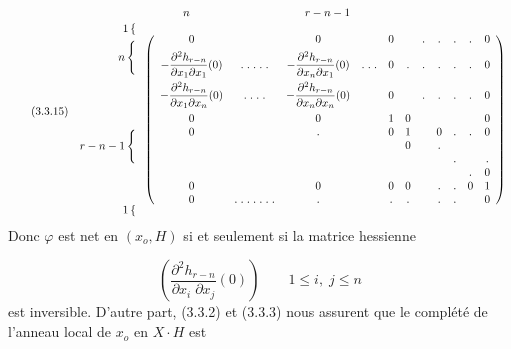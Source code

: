 \begin{equation}\tag{3.3.15}
 \begin{array}{r@{\;}l}
 & \hspace{1.2cm} n \hspace{3.6cm} r-n-1 \\[0.5ex]
\begin{array}{r}
1\,\{ \\[1ex]
n\,\Bigg\{\vphantom{\displaystyle\frac{\partial^2 h_{r-n}}{\partial x_1 \partial x_1}(0)} \\[1.5ex]
\vphantom{\displaystyle\frac{\partial^2 h_{r-n}}{\partial x_1 \partial x_n}(0)} \\[1.5ex]
\\
\\
r-n-1\,\Bigg\{ \\
\\
\\
\\
1\,\{
\end{array}
&
\left(
\begin{array}{ccccccccccc}
0 & & 0 & & 0 & & . & . & . & . & 0 \\[1ex]
-\displaystyle\frac{\partial^2 h_{r-n}}{\partial x_1 \partial x_1}(0) & .\;.\;.\;.\;. & -\displaystyle\frac{\partial^2 h_{r-n}}{\partial x_n \partial x_1}(0) & .\;.\;. & 0 & . & . & . & . & . & 0 \\[2ex]
-\displaystyle\frac{\partial^2 h_{r-n}}{\partial x_1 \partial x_n}(0) & .\;.\;.\;. & -\displaystyle\frac{\partial^2 h_{r-n}}{\partial x_n \partial x_n}(0) & & 0 & & . & . & . & . & 0 \\[2ex]
0 & & 0 & & 1 & 0 & & & & & 0 \\
0 & & . & & 0 & 1 & & 0 & . & . & 0 \\
 & & & & & 0 & & . & & & \\
 & & & & & & & & . & & . \\
 & & & & & & & & & . & 0 \\
0 & & 0 & & 0 & 0 & & . & . & 0 & 1 \\
0 & .\;.\;.\;.\;.\;.\;. & . & & . & . & & . & . & & 0
\end{array}
\right)
\end{array}
\end{equation}
Donc  $\varphi$ est net en  $(x_o,H)$  si et seulement si la matrice hessienne

\begin{equation*}
\left( \displaystyle\frac{\partial^2 h_{r-n}}{\partial x_i \; \partial x_j}(0) \right) \qquad 1 \leq i, \; j \leq n
\end{equation*}
est inversible. D'autre part, (3.3.2) et (3.3.3) nous assurent que le complété de l'anneau local de  $x_o$  en  $X \cdot H$  est

